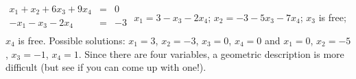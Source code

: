 {$\begin{array}{rcl}
x_1+x_2+6x_3+9x_4&=&0\\
-x_1-x_3-2x_4&=&-3\\
\end{array}$}
{$x_1=3-x_3-2x_4$; $x_2=-3-5x_3-7x_4$; $x_3$ is free; $x_4$ is free. Possible solutions: $x_1 =3$, $x_2 = -3$, $x_3=0$, $x_4=0$ and $x_1 = 0$, $x_2 = -5$, $x_3 =-1$, $x_4=1$. Since there are four variables, a geometric description is more difficult (but see if you can come up with one!).}